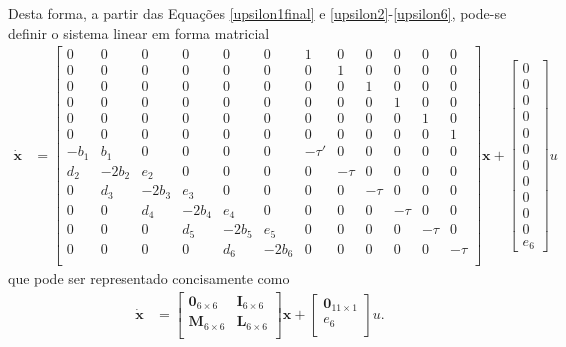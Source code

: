   Desta forma, a partir das Equações \ref{upsilon1final} e \ref{upsilon2}-\ref{upsilon6}, pode-se definir o sistema linear em forma matricial \begin{align}
 	\mathbf{\dot{x}} &= \left[\begin{array}{cccccccccccc}
 		0 & 0 & 0 & 0 & 0 & 0 & 1 & 0 & 0 & 0 & 0 & 0\\
 		0 & 0 & 0 & 0 & 0 & 0 & 0 & 1 & 0 & 0 & 0 & 0\\
 		0 & 0 & 0 & 0 & 0 & 0 & 0 & 0 & 1 & 0 & 0 & 0\\
 		0 & 0 & 0 & 0 & 0 & 0 & 0 & 0 & 0 & 1 & 0 & 0\\
 		0 & 0 & 0 & 0 & 0 & 0 & 0 & 0 & 0 & 0 & 1 & 0\\
 		0 & 0 & 0 & 0 & 0 & 0 & 0 & 0 & 0 & 0 & 0 & 1\\
 		-b_1 & b_1 & 0 & 0 & 0 & 0 & -\tau' & 0     & 0 & 0 & 0 & 0\\
 		d_2 & -2b_2  & e_2  & 0  & 0 & 0 &  0    & -\tau & 0 & 0 & 0 & 0\\
 		0 & d_3 & -2b_3  & e_3  & 0  & 0 & 0 &  0    & -\tau & 0 & 0 & 0\\
 		0 & 0 & d_4 & -2b_4  & e_4  & 0  & 0 & 0 &  0    & -\tau & 0 & 0\\
 		0 & 0 & 0 & d_5 & -2b_5  & e_5  & 0  & 0 & 0 &  0    & -\tau & 0\\
 		0 & 0 & 0 & 0 & d_6 & -2b_6  & 0  & 0 & 0 &  0    & 0   &-\tau\\
 	\end{array}\right]\mathbf{x} + \left[\begin{array}{c}
	0\\	0\\	0\\	0\\	0\\ 0\\ 0\\ 0\\ 0\\ 0\\ 0\\ e_6
\end{array}
\right]u
 \end{align} que pode ser representado concisamente como \begin{align}
 	\mathbf{\dot{x}} &= \left[\begin{array}{cc}
	\mathbf{0}_{6\times 6} & \mathbf{I}_{6\times 6}\\
	\mathbf{M}_{6\times 6} & \mathbf{L}_{6\times 6}\\
\end{array}\right] \mathbf{x} + \left[\begin{array}{c}
	\mathbf{0}_{11\times 1}\\ e_6\\
\end{array} \right]u.
 \end{align}

